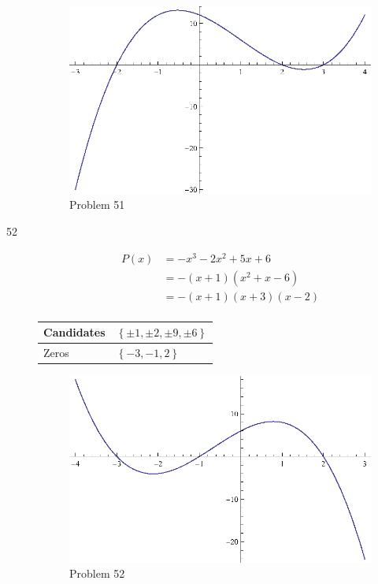 \documentclass{exam}
\begin{document}
\begin{description}
        \begin{figure}[H]
          \centering
          \includegraphics[scale=.9]{problem51.eps}
          \caption*{Problem 51}
        \end{figure}

    \pagebreak

      \item[52] 
        \begin{align*}
          P(x) &= -x^3 - 2x^2 + 5x + 6 \\
               &= - (x + 1)(x^2 + x - 6) \\
               &= - (x + 1)(x + 3)(x - 2) \\
        \end{align*}

        \begin{tabular}{ll}
          \toprule
          Candidates & $\left\{ \pm 1, \pm 2, \pm 9, \pm 6 \right\}$ \\
          \midrule
          Zeros      & $\left\{ -3, -1, 2 \right\}$ \\
          \bottomrule
        \end{tabular}

        \begin{figure}[H]
          \centering
          \includegraphics[scale=.9]{problem52.eps}
          \caption*{Problem 52}
        \end{figure}


\end{description}
\end{document}
